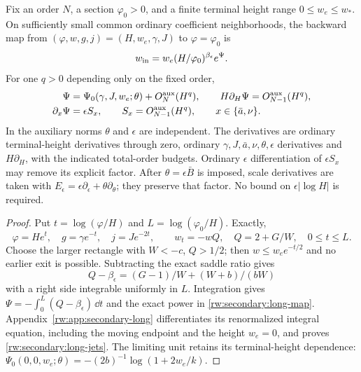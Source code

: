 \begin{proposition}\label{rw:exact-long}
Fix an order $N$, a section $\varphi_0>0$, and a finite terminal
height range $0\le w_e\le w_*$. On sufficiently small common
ordinary coefficient neighborhoods, the backward map from
$(\varphi,w,g,j)=(H,w_e,\gamma,J)$ to $\varphi=\varphi_0$ is
\begin{equation}\label{rw:secondary:long-map}
 w_{\rm in}=w_e(H/\varphi_0)^{\beta_\epsilon}e^\Psi .
\end{equation}
For one $q>0$ depending only on the fixed order,
\begin{equation}\label{rw:secondary:long-jets}
\begin{aligned}
 \Psi&=\Psi_0(\gamma,J,w_e;\theta)+O_N^{\rm aux}(H^q),\qquad
 H\partial_H\Psi=O_{N-1}^{\rm aux}(H^q),\\
 \partial_x\Psi&=\epsilon S_x,\qquad
 S_x=O_{N-1}^{\rm aux}(H^q),\qquad x\in\{\bar a,\nu\}.
\end{aligned}
\end{equation}
In the auxiliary norms $\theta$ and $\epsilon$ are independent.
The derivatives are ordinary terminal-height derivatives through zero,
ordinary $\gamma,J,\bar a,\nu,\theta,\epsilon$ derivatives and
$H\partial_H$, with the indicated total-order budgets.
Ordinary $\epsilon$ differentiation of $\epsilon S_x$ may remove its
explicit factor. After $\theta=\epsilon\bar B$ is imposed, scale
derivatives are taken with
$E_\epsilon=\epsilon\partial_\epsilon+\theta\partial_\theta$;
they preserve that factor. No bound on $\epsilon|\log H|$ is required.
\end{proposition}

\begin{proof}
Put $t=\log(\varphi/H)$ and $L=\log(\varphi_0/H)$. Exactly,
\begin{equation}\label{rw:secondary:long-scalar}
 \varphi=He^t,\quad g=\gamma e^{-t},\quad j=Je^{-2t},\qquad
 w_t=-wQ,\quad Q=2+G/W,\quad 0\le t\le L .
\end{equation}
Choose the larger rectangle with $W<-c$, $Q>1/2$; then
$w\le w_e e^{-t/2}$ and no earlier exit is possible.
Subtracting the exact saddle ratio gives
\[
 Q-\beta_\epsilon=(G-1)/W+(W+b)/(bW)
\]
with a right side integrable uniformly in $L$. Integration gives
$\Psi=-\int_0^L(Q-\beta_\epsilon)\,\dd t$ and the exact power
in \eqref{rw:secondary:long-map}.
Appendix~\ref{rw:app:secondary-long} differentiates its renormalized
integral equation, including the moving endpoint and the height
$w_e=0$, and proves \eqref{rw:secondary:long-jets}.
The limiting unit retains its terminal-height dependence:
$\Psi_0(0,0,w_e;\theta)=-(2b)^{-1}\log(1+2w_e/k)$.
\end{proof}

